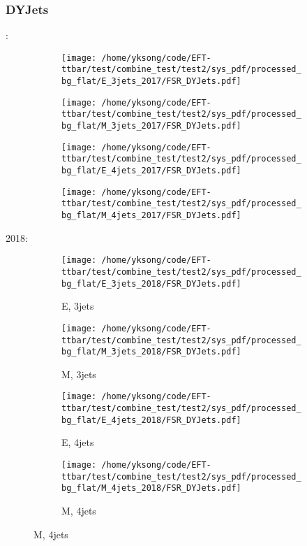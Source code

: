 \documentclass{beamer}
\begin{document}
\begin{frame}
\frametitle{DYJets}
\fontsize{5}{1}:
\begin{figure}
\centering
\begin{subfigure}[b]{0.24\textwidth}
\texttt{[image: /home/yksong/code/EFT-ttbar/test/combine\_test/test2/sys\_pdf/processed\_bg\_flat/E\_3jets\_2017/FSR\_DYJets.pdf]}
\end{subfigure}
\begin{subfigure}[b]{0.24\textwidth}
\texttt{[image: /home/yksong/code/EFT-ttbar/test/combine\_test/test2/sys\_pdf/processed\_bg\_flat/M\_3jets\_2017/FSR\_DYJets.pdf]}
\end{subfigure}
\begin{subfigure}[b]{0.24\textwidth}
\texttt{[image: /home/yksong/code/EFT-ttbar/test/combine\_test/test2/sys\_pdf/processed\_bg\_flat/E\_4jets\_2017/FSR\_DYJets.pdf]}
\end{subfigure}
\begin{subfigure}[b]{0.24\textwidth}
\texttt{[image: /home/yksong/code/EFT-ttbar/test/combine\_test/test2/sys\_pdf/processed\_bg\_flat/M\_4jets\_2017/FSR\_DYJets.pdf]}
\end{subfigure}
\end{figure}
2018:
\begin{figure}
\centering
\begin{subfigure}[b]{0.24\textwidth}
\texttt{[image: /home/yksong/code/EFT-ttbar/test/combine\_test/test2/sys\_pdf/processed\_bg\_flat/E\_3jets\_2018/FSR\_DYJets.pdf]}
\captionsetup{font=tiny}
\caption{E, 3jets}
\end{subfigure}
\begin{subfigure}[b]{0.24\textwidth}
\texttt{[image: /home/yksong/code/EFT-ttbar/test/combine\_test/test2/sys\_pdf/processed\_bg\_flat/M\_3jets\_2018/FSR\_DYJets.pdf]}
\captionsetup{font=tiny}
\caption{M, 3jets}
\end{subfigure}
\begin{subfigure}[b]{0.24\textwidth}
\texttt{[image: /home/yksong/code/EFT-ttbar/test/combine\_test/test2/sys\_pdf/processed\_bg\_flat/E\_4jets\_2018/FSR\_DYJets.pdf]}
\captionsetup{font=tiny}
\caption{E, 4jets}
\end{subfigure}
\begin{subfigure}[b]{0.24\textwidth}
\texttt{[image: /home/yksong/code/EFT-ttbar/test/combine\_test/test2/sys\_pdf/processed\_bg\_flat/M\_4jets\_2018/FSR\_DYJets.pdf]}
\captionsetup{font=tiny}
\caption{M, 4jets}
\end{subfigure}
\end{figure}
\end{frame}
\end{document}

